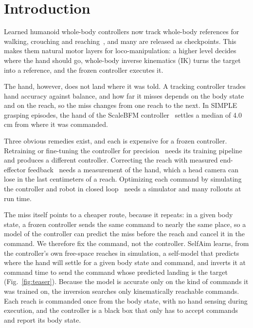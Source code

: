 \documentclass[conference]{IEEEtran}
\begin{document}
\section{Introduction}

Learned humanoid whole-body controllers now track whole-body references for walking, crouching and reaching~\cite{scalebfm,sonic,heft,amo,gr00twbc}, and many are released as checkpoints. This makes them natural motor layers for loco-manipulation: a higher level decides where the hand should go, whole-body inverse kinematics (IK) turns the target into a reference, and the frozen controller executes it.

The hand, however, does not land where it was told. A tracking controller trades hand accuracy against balance, and how far it misses depends on the body state and on the reach, so the miss changes from one reach to the next. In SIMPLE~\cite{simple} grasping episodes, the hand of the ScaleBFM controller~\cite{scalebfm} settles a median of 4.0\,cm from where it was commanded.

Three obvious remedies exist, and each is expensive for a frozen controller. Retraining or fine-tuning the controller for precision~\cite{humanoidndm} needs its training pipeline and produces a different controller. Correcting the reach with measured end-effector feedback~\cite{hero} needs a measurement of the hand, which a head camera can lose in the last centimeters of a reach. Optimizing each command by simulating the controller and robot in closed loop~\cite{ttco} needs a simulator and many rollouts at run time.

The miss itself points to a cheaper route, because it repeats: in a given body state, a frozen controller sends the same command to nearly the same place, so a model of the controller can predict the miss before the reach and cancel it in the command. We therefore fix the command, not the controller. SelfAim learns, from the controller's own free-space reaches in simulation, a self-model that predicts where the hand will settle for a given body state and command, and inverts it at command time to send the command whose predicted landing is the target (Fig.~\ref{fig:teaser}). Because the model is accurate only on the kind of commands it was trained on, the inversion searches only kinematically reachable commands. Each reach is commanded once from the body state, with no hand sensing during execution, and the controller is a black box that only has to accept commands and report its body state.
\end{document}
